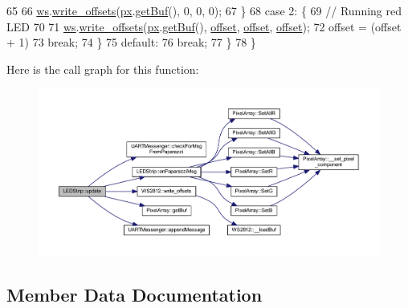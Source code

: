 \begin{DoxyCode}
65 
66             \hyperlink{class_l_e_d_strip_a81c4bffd481d09defe63642c9e69ed17}{ws}.\hyperlink{class_w_s2812_a578fd0b278445bd6f84e260a69b18a68}{write\_offsets}(\hyperlink{class_l_e_d_strip_aa8a8764862dbb64aedc0b53cfe3fc22b}{px}.\hyperlink{class_pixel_array_a987f1dc053a5cf25d78d5cfe037088d3}{getBuf}(), 0, 0, 0);
67         \}
68         \textcolor{keywordflow}{case} 2: \{
69             \textcolor{comment}{// Running red LED}
70 
71             \hyperlink{class_l_e_d_strip_a81c4bffd481d09defe63642c9e69ed17}{ws}.\hyperlink{class_w_s2812_a578fd0b278445bd6f84e260a69b18a68}{write\_offsets}(\hyperlink{class_l_e_d_strip_aa8a8764862dbb64aedc0b53cfe3fc22b}{px}.\hyperlink{class_pixel_array_a987f1dc053a5cf25d78d5cfe037088d3}{getBuf}(), \hyperlink{class_l_e_d_strip_a37a3616a79fe3dda93c145d14543199c}{offset}, 
      \hyperlink{class_l_e_d_strip_a37a3616a79fe3dda93c145d14543199c}{offset}, \hyperlink{class_l_e_d_strip_a37a3616a79fe3dda93c145d14543199c}{offset});
72             offset = (offset + 1) %
73             \textcolor{keywordflow}{break};
74         \}
75         \textcolor{keywordflow}{default}:
76             \textcolor{keywordflow}{break};
77     \}
78 \}
\end{DoxyCode}
Here is the call graph for this function\+:\nopagebreak
\begin{figure}[H]
\begin{center}
\leavevmode
\includegraphics[width=350pt]{class_l_e_d_strip_abc57d90870bb0e9c0d05e7ba6ca76c95_cgraph}
\end{center}
\end{figure}


\subsection{Member Data Documentation}
\mbox{\label{class_abstract_component_a9c9c548149681b1a1dd935e66ed5dd11}} 
